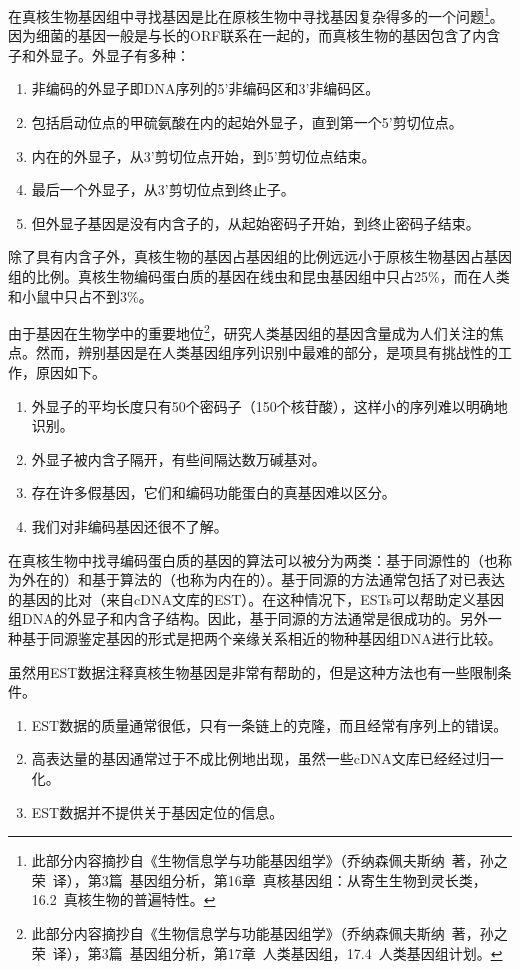 \documentclass[11pt,a4paper,twoside]{book}
\begin{document}
在真核生物基因组中寻找基因是比在原核生物中寻找基因复杂得多的一个问题\footnote{此部分内容摘抄自《生物信息学与功能基因组学》（乔纳森\textbullet 佩夫斯纳\ 著，孙之荣\ 译），第3篇\ 基因组分析，第16章\ 真核基因组：从寄生生物到灵长类，16.2\ 真核生物的普遍特性。}。因为细菌的基因一般是与长的ORF联系在一起的，而真核生物的基因包含了内含子和外显子。外显子有多种：
\begin{enumerate}
  \item 非编码的外显子即DNA序列的5'非编码区和3'非编码区。
  \item 包括启动位点的甲硫氨酸在内的起始外显子，直到第一个5'剪切位点。
  \item 内在的外显子，从3'剪切位点开始，到5'剪切位点结束。
  \item 最后一个外显子，从3'剪切位点到终止子。
  \item 但外显子基因是没有内含子的，从起始密码子开始，到终止密码子结束。
\end{enumerate}
除了具有内含子外，真核生物的基因占基因组的比例远远小于原核生物基因占基因组的比例。真核生物编码蛋白质的基因在线虫和昆虫基因组中只占25\%，而在人类和小鼠中只占不到3\%。

由于基因在生物学中的重要地位\footnote{此部分内容摘抄自《生物信息学与功能基因组学》（乔纳森\textbullet 佩夫斯纳\ 著，孙之荣\ 译），第3篇\ 基因组分析，第17章\ 人类基因组，17.4\ 人类基因组计划。}，研究人类基因组的基因含量成为人们关注的焦点。然而，辨别基因是在人类基因组序列识别中最难的部分，是项具有挑战性的工作，原因如下。
\begin{enumerate}
  \item 外显子的平均长度只有50个密码子（150个核苷酸），这样小的序列难以明确地识别。
  \item 外显子被内含子隔开，有些间隔达数万碱基对。
  \item 存在许多假基因，它们和编码功能蛋白的真基因难以区分。
  \item 我们对非编码基因还很不了解。
\end{enumerate}

在真核生物中找寻编码蛋白质的基因的算法可以被分为两类：基于同源性的（也称为外在的）和基于算法的（也称为内在的）。基于同源的方法通常包括了对已表达的基因的比对（来自cDNA文库的EST）。在这种情况下，ESTs可以帮助定义基因组DNA的外显子和内含子结构。因此，基于同源的方法通常是很成功的。另外一种基于同源鉴定基因的形式是把两个亲缘关系相近的物种基因组DNA进行比较。

虽然用EST数据注释真核生物基因是非常有帮助的，但是这种方法也有一些限制条件。
\begin{enumerate}
  \item EST数据的质量通常很低，只有一条链上的克隆，而且经常有序列上的错误。
  \item 高表达量的基因通常过于不成比例地出现，虽然一些cDNA文库已经经过归一化。
  \item EST数据并不提供关于基因定位的信息。
\end{enumerate}
\end{document}
